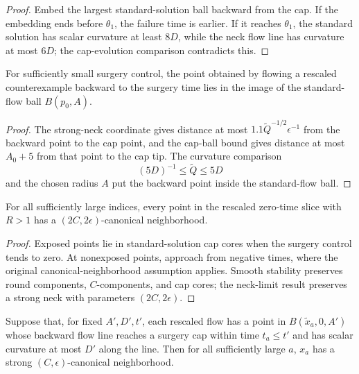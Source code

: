 \begin{proof}
\sketch
{}
Embed the largest standard-solution ball backward from the cap. If the embedding
ends before $\theta_1$, the failure time is earlier. If it reaches $\theta_1$,
the standard solution has scalar curvature at least $8D$, while the neck flow
line has curvature at most $6D$; the cap-evolution comparison contradicts this.
\end{proof}

\begin{claim}
\label{claim:w-ab-in-ball-image}
For sufficiently small surgery control, the point obtained by flowing a
rescaled counterexample backward to the surgery time lies in the image of the
standard-flow ball $B(p_0,A)$.
\end{claim}

\begin{proof}
\sketch
The strong-neck coordinate gives distance at most
$1.1\widetilde Q^{-1/2}\epsilon^{-1}$ from the backward point to the cap point,
and the cap-ball bound gives distance at most $A_0+5$ from that point to the
cap tip. The curvature comparison
\begin{equation}
\label{DQ}
  (5D)^{-1}\leq\widetilde Q\leq5D
\end{equation}
and the chosen radius $A$ put the backward point inside the standard-flow ball.
\end{proof}

\begin{claim}
\label{claim:limit-points-have-canonical-neighborhood}
For all sufficiently large indices, every point in the rescaled zero-time slice
with $R>1$ has a $(2C,2\epsilon)$-canonical neighborhood.
\end{claim}

\begin{proof}
\sketch
{}
Exposed points lie in standard-solution cap cores when the surgery control tends
to zero. At nonexposed points, approach from negative times, where the original
canonical-neighborhood assumption applies. Smooth stability preserves round
components, $C$-components, and cap cores; the neck-limit result preserves a
strong neck with parameters $(2C,2\epsilon)$.
\end{proof}

\begin{lemma}
\label{lem:std-cap-canonical-neighborhood}
\label{lemstdcan}
Suppose that, for fixed $A',D',t'$, each rescaled flow has a point in
$B(\widetilde x_a,0,A')$ whose backward flow line reaches a surgery cap within
time $t_a\leq t'$ and has scalar curvature at most $D'$ along the line. Then
for all sufficiently large $a$, $x_a$ has a strong $(C,\epsilon)$-canonical
neighborhood.
\end{lemma}

